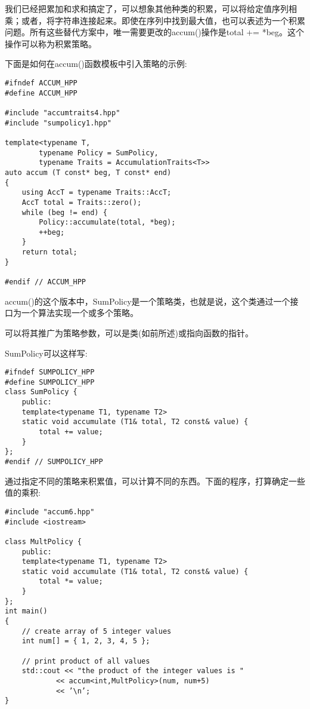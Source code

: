 
我们已经把累加和求和搞定了，可以想象其他种类的积累，可以将给定值序列相乘；或者，将字符串连接起来。即使在序列中找到最大值，也可以表述为一个积累问题。所有这些替代方案中，唯一需要更改的accum()操作是total += *beg。这个操作可以称为积累策略。

下面是如何在accum()函数模板中引入策略的示例:

\begin{lstlisting}[style=styleCXX]
#ifndef ACCUM_HPP
#define ACCUM_HPP

#include "accumtraits4.hpp"
#include "sumpolicy1.hpp"

template<typename T,
		typename Policy = SumPolicy,
		typename Traits = AccumulationTraits<T>>
auto accum (T const* beg, T const* end)
{
	using AccT = typename Traits::AccT;
	AccT total = Traits::zero();
	while (beg != end) {
		Policy::accumulate(total, *beg);
		++beg;
	}
	return total;
}

#endif // ACCUM_HPP
\end{lstlisting}

accum()的这个版本中，SumPolicy是一个策略类，也就是说，这个类通过一个接口为一个算法实现一个或多个策略。

\begin{tcolorbox}[colback=webgreen!5!white,colframe=webgreen!75!black]
\hspace*{0.75cm}可以将其推广为策略参数，可以是类(如前所述)或指向函数的指针。
\end{tcolorbox}

SumPolicy可以这样写:

\begin{lstlisting}[style=styleCXX]
#ifndef SUMPOLICY_HPP
#define SUMPOLICY_HPP
class SumPolicy {
	public:
	template<typename T1, typename T2>
	static void accumulate (T1& total, T2 const& value) {
		total += value;
	}
};
#endif // SUMPOLICY_HPP
\end{lstlisting}

通过指定不同的策略来积累值，可以计算不同的东西。下面的程序，打算确定一些值的乘积:

\begin{lstlisting}[style=styleCXX]
#include "accum6.hpp"
#include <iostream>

class MultPolicy {
	public:
	template<typename T1, typename T2>
	static void accumulate (T1& total, T2 const& value) {
		total *= value;
	}
};
int main()
{
	// create array of 5 integer values
	int num[] = { 1, 2, 3, 4, 5 };
	
	// print product of all values
	std::cout << "the product of the integer values is "
			<< accum<int,MultPolicy>(num, num+5)
			<< ’\n’;
}
\end{lstlisting}

